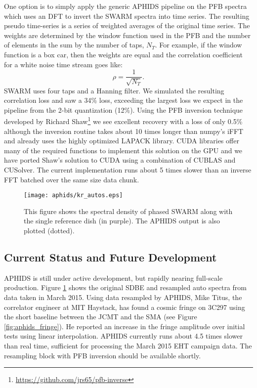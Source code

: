 One option is to simply apply the generic APHIDS pipeline on the PFB spectra which uses an DFT to invert the 
SWARM spectra into time series.  The resulting pseudo time-series is a series of weighted 
averages of the original time series.  The weights are determined by the window function used in the 
PFB and the number of elements in the sum by the number of taps, $N_T$.  For example, if the window function is 
a box car, then the weights are equal and the correlation coefficient for a white noise time stream goes like:
\begin{equation}
\rho = \frac{1}{\sqrt{N_T}}.
\end{equation}
SWARM uses four taps and a Hanning filter.  We simulated the resulting correlation loss and saw a 34\% loss, 
exceeding the largest loss we expect in the pipeline from the 2-bit quantization (12\%).  Using the PFB inversion
technique developed by Richard Shaw\footnote{\url{https://github.com/jrs65/pfb-inverse}} we see excellent 
recovery with a loss of only 0.5\% although the inversion routine takes about 10 times longer than numpy's
iFFT and already uses the highly optimized LAPACK library.  CUDA libraries offer many of the required functions 
to implement this solution on the GPU and we have ported Shaw's solution to CUDA using a combination of 
CUBLAS and CUSolver.  The current implementation runs about 5 times slower than an inverse FFT batched over 
the same size data chunk.

\begin{figure}[t!]
\texttt{[image: aphids/kr\_autos.eps]}
\caption{This figure shows the spectral density of phased SWARM along with the single reference dish 
(in purple).  The APHIDS output is also plotted (dotted).}
\label{fig:swarm_amp_spec}
\end{figure}

\subsection{Current Status and Future Development}

APHIDS is still under active development, but rapidly nearing full-scale production.  Figure \ref{fig:swarm_amp_spec}
shows the original SDBE and resampled auto spectra from data taken in March 2015.  Using data resampled by APHIDS, Mike Titus, 
the correlator engineer at MIT Haystack, has found a cosmic fringe on 3C297 using the short 
baseline between the JCMT and the SMA (see Figure \ref{fig:aphids_fringe}).  He reported an increase in the fringe amplitude over initial tests
using linear interpolation.  APHIDS currently runs about 4.5 times slower than real time, sufficient for 
processing the March 2015 EHT campaign data.  The resampling block with PFB inversion should be available
shortly.

